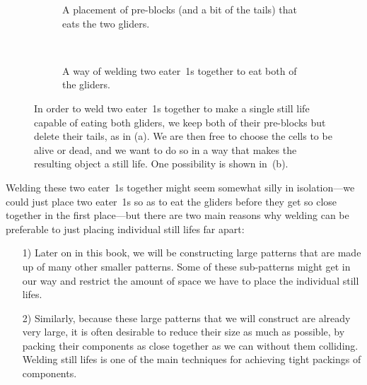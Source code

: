 \begin{figure}[!ht]
	\centering
	\begin{subfigure}{.4\textwidth}
		\centering
		\caption{A placement of pre-blocks (and a bit of the tails) that eats the two gliders.}
		\label{fig:welded_eater_1s_inc}
	\end{subfigure} \quad \ %
	\begin{subfigure}{.54\textwidth}
		\centering
		\caption{A way of welding two eater~1s together to eat both of the gliders.}
		\label{fig:welded_eater_1s}
	\end{subfigure}
	\caption{In order to weld two eater~1s together to make a single still life capable of eating both gliders, we keep both of their pre-blocks but delete their tails, as in (a). We are then free to choose the  cells to be alive or dead, and we want to do so in a way that makes the resulting object a still life. One possibility is shown in~(b).}\label{fig:welded_eater_1s_both}
\end{figure}

Welding these two eater~1s together might seem somewhat silly in isolation---we could just place two eater~1s so as to eat the gliders before they get so close together in the first place---but there are two main reasons why welding can be preferable to just placing individual still lifes far apart:\medskip

\begin{enumerate}
	\item[1)] Later on in this book, we will be constructing large patterns that are made up of many other smaller patterns. Some of these sub-patterns might get in our way and restrict the amount of space we have to place the individual still lifes.\smallskip
	
	\item[2)] Similarly, because these large patterns that we will construct are already very large, it is often desirable to reduce their size as much as possible, by packing their components as close together as we can without them colliding. Welding still lifes is one of the main techniques for achieving tight packings of components.\medskip
\end{enumerate}

